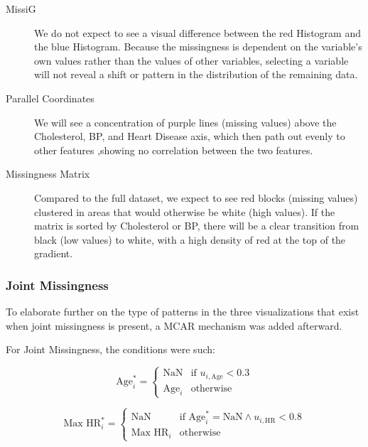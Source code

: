 \documentclass[a4paper, 11pt]{article}
\begin{document}
\begin{description}
        \item [MissiG] We do not expect to see a visual difference between the
                red Histogram and the blue Histogram. Because the missingness
                is dependent on the variable's own values rather than the
                values of other variables, selecting a variable will not reveal
                a shift or pattern in the distribution of the remaining data.

        \item [Parallel Coordinates] We will see a concentration of purple
                lines (missing values) above the Cholesterol, BP, and Heart
                Disease axis, which then path out evenly to other features
                ,showing no correlation between the two features.

        \item [Missingness Matrix] Compared to the full dataset, we expect to
                see red blocks (missing values) clustered in areas that would
                otherwise be white (high values). If the matrix is sorted by
                Cholesterol or BP, there will be a clear transition from black
                (low values) to white, with a high density of red at the top of
                the gradient.
\end{description}

\subsubsection*{Joint Missingness}
To elaborate further on the type of patterns in the three visualizations that
exist when joint missingness is present, a MCAR mechanism was added afterward.

For Joint Missingness, the conditions were such:

\begin{equation}
    \text{Age}_i^* = 
    \begin{cases} 
    \text{NaN} & \text{if } u_{i, \text{Age}} < 0.3 \\ 
    \text{Age}_i & \text{otherwise} 
    \end{cases}
\end{equation}

\begin{equation}
    \text{Max HR}_i^* = 
    \begin{cases} 
    \text{NaN} & \text{if } \text{Age}_i^* = \text{NaN} \land u_{i, \text{HR}} < 0.8 \\ 
    \text{Max HR}_i & \text{otherwise} 
    \end{cases}
\end{equation}
\end{document}
